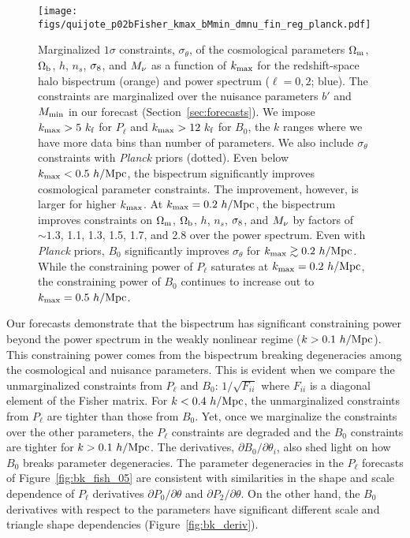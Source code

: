 \begin{figure}
\begin{center}
    \texttt{[image: figs/quijote\_p02bFisher\_kmax\_bMmin\_dmnu\_fin\_reg\_planck.pdf]} 
    \caption{Marginalized $1\sigma$ constraints, $\sigma_\theta$, of the cosmological 
    parameters $\Omega_{\rm m}$, $\Omega_{\rm b}$, $h$, $n_s$, $\sigma_8$, and $M_\nu$ as a function 
    of $k_{\rm max}$ for the redshift-space halo bispectrum (orange) and power 
    spectrum ($\ell = 0, 2$; blue). The constraints are marginalized over the nuisance parameters 
    $b'$ and $M_{\rm min}$ in our forecast (Section~\ref{sec:forecasts}). We impose 
    $k_{\rm max} > 5~k_{\rm f}$ for $P_\ell$ and $k_{\rm max} > 12~k_{\rm f}$ 
    for $B_0$, the $k$ ranges where we have more data bins than number of parameters. 
    We also include $\sigma_\theta$ constraints with {\em Planck} priors (dotted). 
    Even below $k_{\rm max} < 0.5~h/{\rm Mpc}$, the bispectrum significantly 
    improves cosmological parameter constraints. The improvement, however, is larger 
    for higher $k_{\rm max}$. At $k_{\rm max} = 0.2~h/{\rm Mpc}$, the bispectrum 
    improves constraints on $\Omega_{\rm m}$, $\Omega_{\rm b}$, $h$, $n_s$, $\sigma_8$, and $M_\nu$ by factors 
    of $\sim 1.3$, 1.1, 1.3, 1.5, 1.7, and 2.8 over the power spectrum. Even with 
    {\em Planck} priors, $B_0$ significantly improves $\sigma_\theta$ for $k_{\rm max} \gtrsim 0.2~h/{\rm Mpc}$. 
    While the constraining power of $P_\ell$ saturates at $k_{\rm max} = 0.2~h/{\rm Mpc}$,
    the constraining power of $B_0$ continues to increase out to $k_{\rm max} = 0.5~h/{\rm Mpc}$.}
\label{fig:fish_kmax}
\end{center}
\end{figure}
Our forecasts demonstrate that the bispectrum has significant constraining power 
beyond the power spectrum in the weakly nonlinear regime ($k > 0.1~h/{\rm Mpc}$). 
This constraining power 
comes from the bispectrum breaking degeneracies among the cosmological and 
nuisance parameters. This is evident when we compare the unmarginalized 
constraints from $P_\ell$ and $B_0$: $1/\sqrt{F_{ii}}$ where $F_{ii}$ is a 
diagonal element of the Fisher matrix. For $k < 0.4~h/{\rm Mpc}$, the unmarginalized 
constraints from $P_\ell$ are tighter than those from $B_0$. Yet, once we 
marginalize the constraints over the other parameters, the $P_\ell$ constraints 
are degraded and the $B_0$ constraints are tighter for $k > 0.1~h/{\rm Mpc}$. The derivatives, 
$\partial B_0/\partial \theta_i$, also shed light on how $B_0$ breaks parameter 
degeneracies. The parameter degeneracies in the $P_\ell$ forecasts of Figure~\ref{fig:bk_fish_05} 
are consistent with similarities in the shape and scale dependence of 
$P_\ell$ derivatives $\partial P_0/\partial \theta$ and $\partial P_2/\partial \theta$. 
On the other hand, the $B_0$ derivatives with respect to the parameters 
have significant different scale and triangle shape dependencies (Figure~\ref{fig:bk_deriv}).

